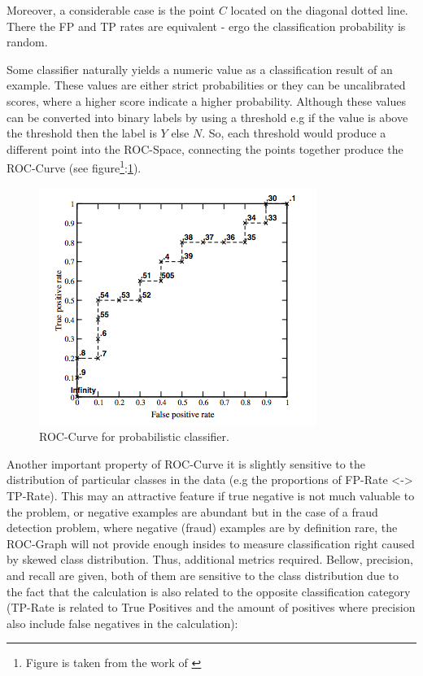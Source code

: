 Moreover, a considerable case is the point \(C\) located on the diagonal dotted line. There the FP and TP rates are equivalent - ergo the classification probability is random.

Some classifier naturally yields a numeric value as a classification result of an example. These values are either strict probabilities or they can be uncalibrated scores, where a higher score indicate a higher probability. Although these values can be converted into binary labels by using a threshold e.g if the value is above the threshold then the label is \(Y\) else \(N\). So, each threshold would produce a different point into the ROC-Space, connecting the points together produce the ROC-Curve (see figure\footnote{Figure is taken from the work of \cite{Fawcett:2006:IRA:1159473.1159475}}:\ref{fig:roc-curve}). 

\begin{figure}[h!]
    \centering
    \includegraphics[scale=0.7]{Graphics/roc-curve.png}
    \caption{ROC-Curve for probabilistic classifier.}
    \label{fig:roc-curve}
\end{figure}

Another important property of ROC-Curve it is slightly sensitive to the distribution of particular classes in the data (e.g the proportions of FP-Rate <-> TP-Rate). This may an attractive feature if true negative is not much valuable to the problem, or negative examples are abundant but in the case of a fraud detection problem, where negative (fraud) examples are by definition rare, the ROC-Graph will not provide enough insides to measure classification right caused by skewed class distribution. Thus, additional metrics required.
Bellow, precision, and recall are given, both of them are sensitive to the class distribution due to the fact that the calculation is also related to the opposite classification category (TP-Rate is related to True Positives and the amount of positives where precision also include false negatives in the calculation):

